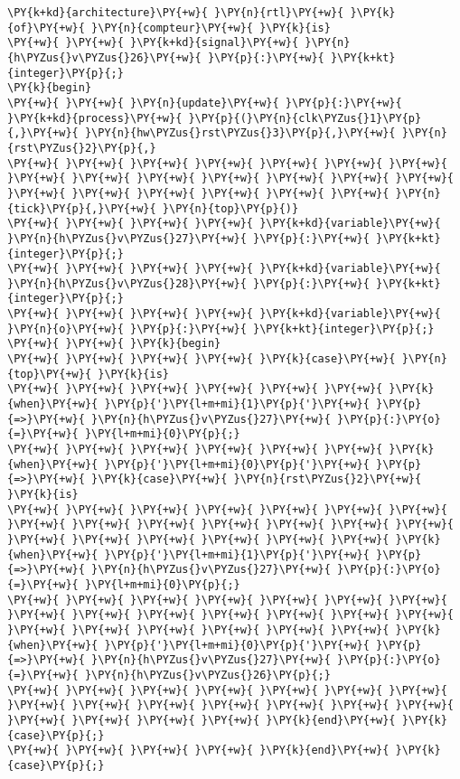 \begin{Verbatim}[commandchars=\\\{\}]
\PY{k+kd}{architecture}\PY{+w}{ }\PY{n}{rtl}\PY{+w}{ }\PY{k}{of}\PY{+w}{ }\PY{n}{compteur}\PY{+w}{ }\PY{k}{is}
\PY{+w}{ }\PY{+w}{ }\PY{k+kd}{signal}\PY{+w}{ }\PY{n}{h\PYZus{}v\PYZus{}26}\PY{+w}{ }\PY{p}{:}\PY{+w}{ }\PY{k+kt}{integer}\PY{p}{;}
\PY{k}{begin}
\PY{+w}{ }\PY{+w}{ }\PY{n}{update}\PY{+w}{ }\PY{p}{:}\PY{+w}{ }\PY{k+kd}{process}\PY{+w}{ }\PY{p}{(}\PY{n}{clk\PYZus{}1}\PY{p}{,}\PY{+w}{ }\PY{n}{hw\PYZus{}rst\PYZus{}3}\PY{p}{,}\PY{+w}{ }\PY{n}{rst\PYZus{}2}\PY{p}{,}
\PY{+w}{ }\PY{+w}{ }\PY{+w}{ }\PY{+w}{ }\PY{+w}{ }\PY{+w}{ }\PY{+w}{ }\PY{+w}{ }\PY{+w}{ }\PY{+w}{ }\PY{+w}{ }\PY{+w}{ }\PY{+w}{ }\PY{+w}{ }\PY{+w}{ }\PY{+w}{ }\PY{+w}{ }\PY{+w}{ }\PY{+w}{ }\PY{+w}{ }\PY{n}{tick}\PY{p}{,}\PY{+w}{ }\PY{n}{top}\PY{p}{)}
\PY{+w}{ }\PY{+w}{ }\PY{+w}{ }\PY{+w}{ }\PY{k+kd}{variable}\PY{+w}{ }\PY{n}{h\PYZus{}v\PYZus{}27}\PY{+w}{ }\PY{p}{:}\PY{+w}{ }\PY{k+kt}{integer}\PY{p}{;}
\PY{+w}{ }\PY{+w}{ }\PY{+w}{ }\PY{+w}{ }\PY{k+kd}{variable}\PY{+w}{ }\PY{n}{h\PYZus{}v\PYZus{}28}\PY{+w}{ }\PY{p}{:}\PY{+w}{ }\PY{k+kt}{integer}\PY{p}{;}
\PY{+w}{ }\PY{+w}{ }\PY{+w}{ }\PY{+w}{ }\PY{k+kd}{variable}\PY{+w}{ }\PY{n}{o}\PY{+w}{ }\PY{p}{:}\PY{+w}{ }\PY{k+kt}{integer}\PY{p}{;}
\PY{+w}{ }\PY{+w}{ }\PY{k}{begin}
\PY{+w}{ }\PY{+w}{ }\PY{+w}{ }\PY{+w}{ }\PY{k}{case}\PY{+w}{ }\PY{n}{top}\PY{+w}{ }\PY{k}{is}
\PY{+w}{ }\PY{+w}{ }\PY{+w}{ }\PY{+w}{ }\PY{+w}{ }\PY{+w}{ }\PY{k}{when}\PY{+w}{ }\PY{p}{'}\PY{l+m+mi}{1}\PY{p}{'}\PY{+w}{ }\PY{p}{=>}\PY{+w}{ }\PY{n}{h\PYZus{}v\PYZus{}27}\PY{+w}{ }\PY{p}{:}\PY{o}{=}\PY{+w}{ }\PY{l+m+mi}{0}\PY{p}{;}
\PY{+w}{ }\PY{+w}{ }\PY{+w}{ }\PY{+w}{ }\PY{+w}{ }\PY{+w}{ }\PY{k}{when}\PY{+w}{ }\PY{p}{'}\PY{l+m+mi}{0}\PY{p}{'}\PY{+w}{ }\PY{p}{=>}\PY{+w}{ }\PY{k}{case}\PY{+w}{ }\PY{n}{rst\PYZus{}2}\PY{+w}{ }\PY{k}{is}
\PY{+w}{ }\PY{+w}{ }\PY{+w}{ }\PY{+w}{ }\PY{+w}{ }\PY{+w}{ }\PY{+w}{ }\PY{+w}{ }\PY{+w}{ }\PY{+w}{ }\PY{+w}{ }\PY{+w}{ }\PY{+w}{ }\PY{+w}{ }\PY{+w}{ }\PY{+w}{ }\PY{+w}{ }\PY{+w}{ }\PY{+w}{ }\PY{+w}{ }\PY{k}{when}\PY{+w}{ }\PY{p}{'}\PY{l+m+mi}{1}\PY{p}{'}\PY{+w}{ }\PY{p}{=>}\PY{+w}{ }\PY{n}{h\PYZus{}v\PYZus{}27}\PY{+w}{ }\PY{p}{:}\PY{o}{=}\PY{+w}{ }\PY{l+m+mi}{0}\PY{p}{;}
\PY{+w}{ }\PY{+w}{ }\PY{+w}{ }\PY{+w}{ }\PY{+w}{ }\PY{+w}{ }\PY{+w}{ }\PY{+w}{ }\PY{+w}{ }\PY{+w}{ }\PY{+w}{ }\PY{+w}{ }\PY{+w}{ }\PY{+w}{ }\PY{+w}{ }\PY{+w}{ }\PY{+w}{ }\PY{+w}{ }\PY{+w}{ }\PY{+w}{ }\PY{k}{when}\PY{+w}{ }\PY{p}{'}\PY{l+m+mi}{0}\PY{p}{'}\PY{+w}{ }\PY{p}{=>}\PY{+w}{ }\PY{n}{h\PYZus{}v\PYZus{}27}\PY{+w}{ }\PY{p}{:}\PY{o}{=}\PY{+w}{ }\PY{n}{h\PYZus{}v\PYZus{}26}\PY{p}{;}
\PY{+w}{ }\PY{+w}{ }\PY{+w}{ }\PY{+w}{ }\PY{+w}{ }\PY{+w}{ }\PY{+w}{ }\PY{+w}{ }\PY{+w}{ }\PY{+w}{ }\PY{+w}{ }\PY{+w}{ }\PY{+w}{ }\PY{+w}{ }\PY{+w}{ }\PY{+w}{ }\PY{+w}{ }\PY{+w}{ }\PY{k}{end}\PY{+w}{ }\PY{k}{case}\PY{p}{;}
\PY{+w}{ }\PY{+w}{ }\PY{+w}{ }\PY{+w}{ }\PY{k}{end}\PY{+w}{ }\PY{k}{case}\PY{p}{;}
\end{Verbatim}

